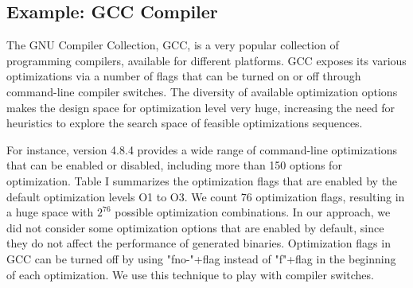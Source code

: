 \subsection{Example: GCC Compiler}

The GNU Compiler Collection, GCC, is a very popular collection of programming compilers, available for different platforms.
GCC exposes its various optimizations via a number of flags that can be turned on or off through command-line compiler switches. 
The diversity of available optimization options makes the design space for optimization level very huge, increasing the need for heuristics to explore the search space of feasible optimizations sequences.


For instance, version 4.8.4 provides a wide range of command-line optimizations that can be enabled or disabled, including more than 150 options for optimization. 
Table I summarizes the optimization flags that are enabled by the default optimization levels O1 to O3.
We count 76 optimization flags, resulting in a huge space with $2^{76}$ possible optimization combinations.
In our approach, we did not consider some optimization options that are enabled by default, since they do not affect the performance of generated binaries.
Optimization flags in GCC can be turned off by using "fno-"+flag instead of "f"+flag in the beginning of each optimization. 
We use this technique to play with compiler switches.

